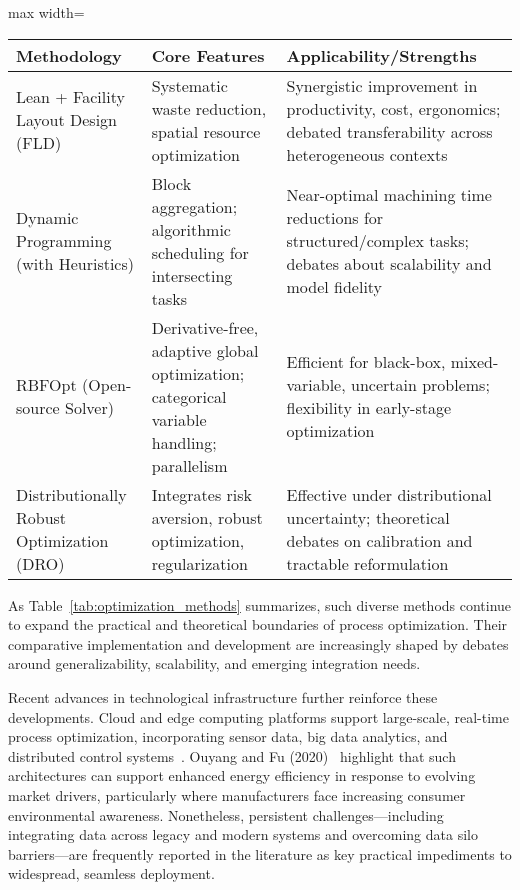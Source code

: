 \documentclass[sigconf]{acmart}
\begin{document}
\begin{table*}[htbp]
  \centering
  \caption{Summary of Selected Optimization Approaches and Their Core Features}
  \label{tab:optimization_methods}
  \begin{adjustbox}{max width=\textwidth}
  \begin{tabular}{lll}
  \toprule
  \textbf{Methodology} & \textbf{Core Features} & \textbf{Applicability/Strengths} \\
  \midrule
  Lean + Facility Layout Design (FLD) & Systematic waste reduction, spatial resource optimization & Synergistic improvement in productivity, cost, ergonomics; debated transferability across heterogeneous contexts \\
  Dynamic Programming (with Heuristics) & Block aggregation; algorithmic scheduling for intersecting tasks & Near-optimal machining time reductions for structured/complex tasks; debates about scalability and model fidelity \\
  RBFOpt (Open-source Solver) & Derivative-free, adaptive global optimization; categorical variable handling; parallelism & Efficient for black-box, mixed-variable, uncertain problems; flexibility in early-stage optimization \\
  Distributionally Robust Optimization (DRO) & Integrates risk aversion, robust optimization, regularization & Effective under distributional uncertainty; theoretical debates on calibration and tractable reformulation \\
  \bottomrule
  \end{tabular}
  \end{adjustbox}
\end{table*}

As Table~\ref{tab:optimization_methods} summarizes, such diverse methods continue to expand the practical and theoretical boundaries of process optimization. Their comparative implementation and development are increasingly shaped by debates around generalizability, scalability, and emerging integration needs.

Recent advances in technological infrastructure further reinforce these developments. Cloud and edge computing platforms support large-scale, real-time process optimization, incorporating sensor data, big data analytics, and distributed control systems~\cite{ref80}. Ouyang and Fu (2020)~\cite{ref80} highlight that such architectures can support enhanced energy efficiency in response to evolving market drivers, particularly where manufacturers face increasing consumer environmental awareness. Nonetheless, persistent challenges—including integrating data across legacy and modern systems and overcoming data silo barriers—are frequently reported in the literature as key practical impediments to widespread, seamless deployment.
\end{document}
